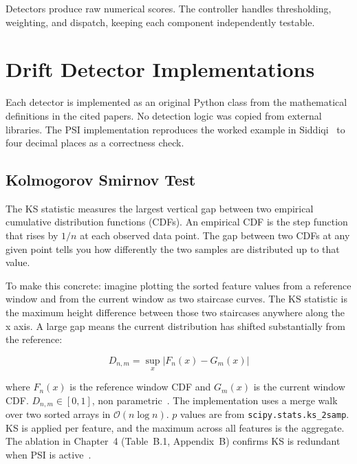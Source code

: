 Detectors produce raw numerical scores. The controller handles thresholding, weighting, and dispatch, keeping each component independently testable.

\section{Drift Detector Implementations}
\label{sec:detectors}

Each detector is implemented as an original Python class from the mathematical definitions in the cited papers. No detection logic was copied from external libraries. The PSI implementation reproduces the worked example in Siddiqi~\cite{siddiqi2006} to four decimal places as a correctness check.

\subsection{Kolmogorov Smirnov Test}
\label{subsec:ks}

The KS statistic measures the largest vertical gap between two empirical cumulative distribution functions (CDFs). An empirical CDF is the step function that rises by $1/n$ at each observed data point. The gap between two CDFs at any given point tells you how differently the two samples are distributed up to that value.

To make this concrete: imagine plotting the sorted feature values from a reference window and from the current window as two staircase curves. The KS statistic is the maximum height difference between those two staircases anywhere along the x axis. A large gap means the current distribution has shifted substantially from the reference:

\begin{equation}
  D_{n,m} = \sup_{x} \left| F_n(x) - G_m(x) \right|
  \label{eq:ks}
\end{equation}

where $F_n(x)$ is the reference window CDF and $G_m(x)$ is the current window CDF. $D_{n,m} \in [0,1]$, non parametric~\cite{kolmogorov1933,smirnov1948,engle1982}. The implementation uses a merge walk over two sorted arrays in $\mathcal{O}(n \log n)$. $p$ values are from \texttt{scipy.stats.ks\_2samp}. KS is applied per feature, and the maximum across all features is the aggregate. The ablation in Chapter~4 (Table~B.1, Appendix~B) confirms KS is redundant when PSI is active~\cite{rabanser2019}.

